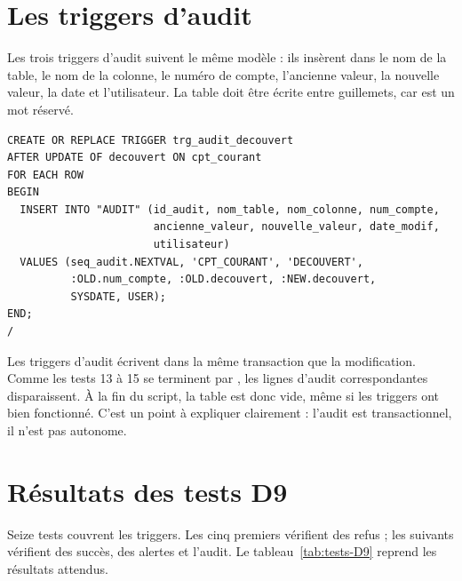\section{Les triggers d'audit}

Les trois triggers d'audit suivent le même modèle : ils insèrent dans
 le nom de la table, le nom de la colonne, le numéro de compte,
l'ancienne valeur, la nouvelle valeur, la date et l'utilisateur. La table
 doit être écrite entre guillemets, car  est un mot
réservé.

\begin{lstlisting}[caption={Audit du découvert autorisé.},label={lst:trg-audit}]
CREATE OR REPLACE TRIGGER trg_audit_decouvert
AFTER UPDATE OF decouvert ON cpt_courant
FOR EACH ROW
BEGIN
  INSERT INTO "AUDIT" (id_audit, nom_table, nom_colonne, num_compte,
                       ancienne_valeur, nouvelle_valeur, date_modif,
                       utilisateur)
  VALUES (seq_audit.NEXTVAL, 'CPT_COURANT', 'DECOUVERT',
          :OLD.num_compte, :OLD.decouvert, :NEW.decouvert,
          SYSDATE, USER);
END;
/
\end{lstlisting}

\begin{attentionbox}
Les triggers d'audit écrivent dans la même transaction que la modification.
Comme les tests 13 à 15 se terminent par , les lignes d'audit
correspondantes disparaissent. À la fin du script, la table  est
donc vide, même si les triggers ont bien fonctionné. C'est un point à expliquer
clairement : l'audit est transactionnel, il n'est pas autonome.
\end{attentionbox}

\section{Résultats des tests D9}

Seize tests couvrent les triggers. Les cinq premiers vérifient des refus ; les
suivants vérifient des succès, des alertes et l'audit. Le
tableau~\ref{tab:tests-D9} reprend les résultats attendus.

